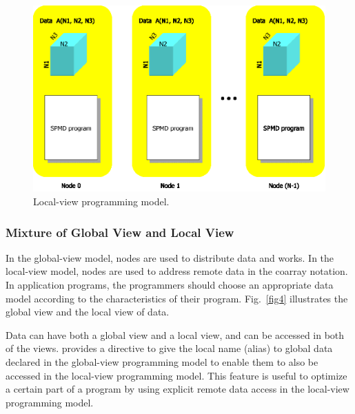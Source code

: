 \begin{figure}
  \centering
  \includegraphics[width=12cm]{figs/Fig3.eps}
  \caption{Local-view programming model.}
\label{fig3}
\end{figure}


\subsubsection{Mixture of Global View and Local View}

In the global-view model, nodes are used to distribute data and works. In the
local-view model, nodes are used to address remote data in the coarray
notation.
%
In application programs,
the programmers should choose an appropriate data model according to the
characteristics of their program. Fig.~\ref{fig4} illustrates the global view
and the local view of data.

Data can have both a global view and a local view, and can be accessed
in both of the views. {\XMP} provides a directive to give the local name
(alias) to global data declared in the global-view programming model
to enable them to also be accessed in the local-view programming
model. This feature is useful to optimize a certain part of a program
by using explicit remote data access in the local-view programming
model.

